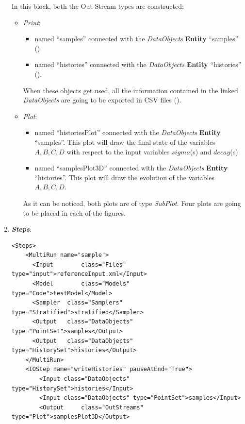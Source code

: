 \begin{enumerate}
  In this block, both the Out-Stream types are constructed: 
  \begin{itemize}
    \item \textit{Print}: 
     \begin{itemize}
       \item named ``samples'' connected with the \textit{DataObjects} \textbf{Entity} ``samples'' 
                ()
       \item named ``histories'' connected with the \textit{DataObjects} \textbf{Entity} ``histories'' ().
     \end{itemize}         
      When these objects get used, all the information contained in the 
      linked  \textit{DataObjects} are going 
    to be exported in CSV files ().
    \item \textit{Plot}: 
    \begin{itemize}
      \item named ``historiesPlot'' connected with the  \textit{DataObjects} 
      \textbf{Entity} ``samples''.  This plot will draw the final state of the
      variables $A,B,C,D$ with respect to the input variables $sigma$(s) 
      and $decay$(s)
      \item named ``samplesPlot3D'' connected with the  
      \textit{DataObjects} \textbf{Entity} ``histories''. This plot will draw the 
      evolution of the variables $A,B,C,D$.
    \end{itemize}
     As it can be noticed, both plots are of type \textit{SubPlot}. Four plots
     are going to be placed in each of the figures.
  \end{itemize}   
   \item \textbf{\textit{Steps}}:   
\begin{lstlisting}[style=XML,morekeywords={arg,extension,pauseAtEnd,overwrite}]
  <Steps>
    <MultiRun name="sample">
      <Input 	    class="Files" 			 type="input">referenceInput.xml</Input>
      <Model 	    class="Models" 		 type="Code">testModel</Model>
      <Sampler 	class="Samplers" 		 type="Stratified">stratified</Sampler>
      <Output 	class="DataObjects"  type="PointSet">samples</Output>
      <Output 	class="DataObjects"  type="HistorySet">histories</Output>
    </MultiRun>
    <IOStep name="writeHistories" pauseAtEnd="True">
        <Input class="DataObjects" type="HistorySet">histories</Input>
        <Input class="DataObjects" type="PointSet">samples</Input>
        <Output 	class="OutStreams" type="Plot">samplesPlot3D</Output>

\end{lstlisting}
\end{enumerate}
